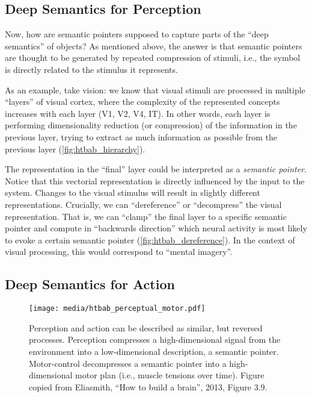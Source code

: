 \documentclass[10pt,letterpaper,oneside]{article}
\begin{document}
\subsection{Deep Semantics for Perception}

Now, how are semantic pointers supposed to capture parts of the \enquote{deep semantics} of objects? As mentioned above, the answer is that semantic pointers are thought to be generated by repeated compression of stimuli, i.e., the symbol is directly related to the stimulus it represents.

As an example, take vision: we know that visual stimuli are processed in multiple \enquote{layers} of visual cortex, where the complexity of the represented concepts increases with each layer (V1, V2, V4, IT). In other words, each layer is performing dimensionality reduction (or compression) of the information in the previous layer, trying to extract as much information as possible from the previous layer (\cref{fig:htbab_hierarchy}).

The representation in the \enquote{final} layer could be interpreted as a \emph{semantic pointer}. Notice that this vectorial representation is directly influenced by the input to the system. Changes to the visual stimulus will result in slightly different representations. Crucially, we can \enquote{dereference} or \enquote{decompress} the visual representation. That is, we can \enquote{clamp} the final layer to a specific semantic pointer and compute in \enquote{backwards direction} which neural activity is most likely to evoke a certain semantic pointer (\cref{fig:htbab_dereference}). In the context of visual processing, this would correspond to \enquote{mental imagery}.

\subsection{Deep Semantics for Action}

\begin{figure}
	\centering
	\texttt{[image: media/htbab\_perceptual\_motor.pdf]}
	\caption{Perception and action can be described as similar, but reversed processes. Perception compresses a high-dimensional signal from the environment into a low-dimensional description, a semantic pointer. Motor-control decompresses a semantic pointer into a high-dimensional motor plan (i.e., muscle tensions over time). Figure copied from Eliasmith, \enquote{How to build a brain}, 2013, Figure 3.9.}
\end{figure}
\end{document}
